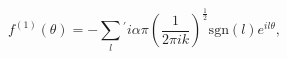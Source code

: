 \begin{equation}
f^{\left( 1\right) }(\theta )= -\sum_{l} {}^{\prime}i\alpha \pi
 \left( \frac{1}{2\pi ik}\right) ^{\frac{1}{2}} \mathrm{sgn}(l) e^{il\theta },
\end{equation}

